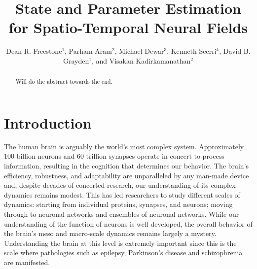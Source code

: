 \documentclass[12pt]{iopart}		%
\begin{document}
\title[State and Parameter Estimation for Spatio-Temporal Neural Fields]{State and Parameter Estimation for Spatio-Temporal Neural Fields}

\author{Dean R. Freestone$^1$, Parham Aram$^2$, Michael Dewar$^3$, Kenneth Scerri$^4$, David B. Grayden$^1$, and Visakan Kadirkamanathan$^2$}

\address{$^1$ Department
of Electrical and Electronic Engineering, University of Melbourne, Melbourne,
Vic, 3010 Australia}
\address{$^2$ Department
of Automatic Control and Systems Engineering, University of Sheffield, Mappin Street, Sheffield,
S1 3JD, UK}
\address{$^3$ Mike's}
\address{$^4$ Ken's}
\begin{abstract}
Will do the abstract towards the end.
\end{abstract}

\maketitle

\section{Introduction}
The human brain is arguably the world's most complex system. Approximately 100 billion neurons and 60 trillion synapses operate in concert to process information, resulting in the cognition that determines our behavior. The brain's efficiency, robustness, and adaptability are unparalleled by any man-made device and, despite decades of concerted research, our understanding of its complex dynamics remains modest. This has led researchers to study different scales of dynamics: starting from individual proteins, synapses, and neurons; moving through to neuronal networks and ensembles of neuronal networks. While our understanding of the function of neurons is well developed, the overall behavior of the brain's meso and macro-scale dynamics remains largely a mystery.  Understanding the brain at this level is extremely important since this is the scale where pathologies such as epilepsy, Parkinson's disease and schizophrenia are manifested.
\end{document}
